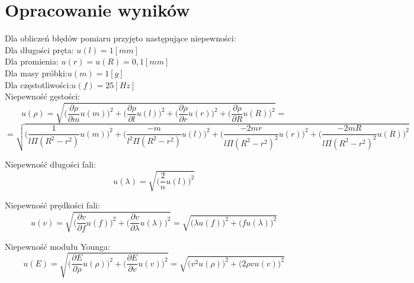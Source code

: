 \documentclass{article}
\begin{document}
\section{Opracowanie wyników}
	Dla obliczeń błędów pomiaru przyjęto następujące niepewności:\\
	Dla długości pręta: $u(l)=1 [mm]$\\
	Dla promienia: $u(r)=u(R)=0,1[mm]$\\
	Dla masy próbki:$u(m)=1 [g]$\\
	Dla częstotliwości:$u(f)=25 [Hz]$\\
	
	Niepewność gęstości:
	$$ u(\rho)=\sqrt{\bigg(\frac{\partial \rho}{\partial m}u(m)\bigg)^2+\bigg(\frac{\partial \rho}{\partial l}u(l)\bigg)^2+\bigg(\frac{\partial \rho}{\partial r}u(r)\bigg)^2+\bigg(\frac{\partial \rho}{\partial R}u(R)\bigg)^2} = $$ $$ = \sqrt{\bigg(\frac{1}{l\Pi (R^2-r^2)}u(m)\bigg)^2+\bigg(\frac{-m}{l^2 \Pi(R^2-r^2)}u(l)\bigg)^2+\bigg(\frac{-2mr}{l\Pi (R^2-r^2)^2}u(r)\bigg)^2+\bigg(\frac{-2mR}{l\Pi (R^2-r^2)^2}u(R)\bigg)^2}$$
	
	Niepewność długości fali:
	$$ u(\lambda)=\sqrt{\bigg(\frac{2}{n}u(l)\bigg)^2}$$
	
	Niepewność prędkości fali:
	$$ u(v)=\sqrt{\bigg(\frac{\partial v}{\partial f}u(f)\bigg)^2+\bigg(\frac{\partial v}{\partial \lambda}u(\lambda)\bigg)^2}=\sqrt{\bigg(\lambda u(f)\bigg)^2+\bigg(f u(\lambda)\bigg)^2}$$
	
	Niepewność modułu Younga:
	$$ u(E)=\sqrt{\bigg(\frac{\partial E}{\partial \rho}u(\rho)\bigg)^2+\bigg(\frac{\partial E}{\partial v}u(v)\bigg)^2} =
	\sqrt{\bigg(v^2 u(\rho)\bigg)^2+\bigg(2 \rho v u(v)\bigg)^2}$$
	
\end{document}
